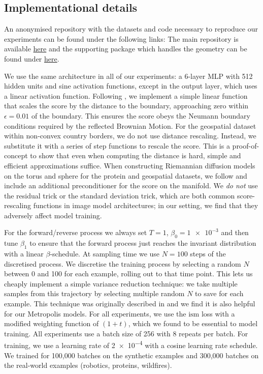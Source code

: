 \subsection{Implementational details}
\label{sec:app_implementational_details}

An anonymised repository with the datasets and code necessary to reproduce our experiments can be found under the following links: The main repository is available \href{https://anonymous.4open.science/r/constrained-diffusion-models/}{here} and the supporting package which handles the geometry can be found under \href{https://anonymous.4open.science/r/geomstats-with-boundary/}{here}.

We use the same architecture in all of our experiments: a 6-layer MLP with 512 hidden units and sine activation functions, except in the output layer, which uses a linear activation function.
Following \cite{fishman2023diffusion}, we implement a simple linear function that scales the score by the distance to the boundary, approaching zero within $\epsilon = 0.01$ of the boundary.
This ensures the score obeys the Neumann boundary conditions required by the reflected Brownian Motion.
For the geospatial dataset within non-convex country borders, we do not use distance rescaling.
Instead, we substitute it with a series of step functions to rescale the score.
This is a proof-of-concept to show that even when computing the distance is hard, simple and efficient approximations suffice.
When constructing Riemannian diffusion models on the torus and sphere for the protein and geospatial datasets, we follow \cite{de2022riemannian} and include an additional preconditioner for the score on the manifold.
We \emph{do not} use the residual trick or the standard deviation trick, which are both common score-rescaling functions in image model architectures; in our setting, we find that they adversely affect model training.

For the forward/reverse process we always set $T=1$, $\beta_0=\num{1e-3}$ and then tune $\beta_1$ to ensure that the forward process just reaches the invariant distribution with a linear $\beta$-schedule.
At sampling time we use $N=100$ steps of the discretised process.
We discretise the training process by selecting a random $N$ between 0 and 100 for each example, rolling out to that time point.
This lets us cheaply implement a simple variance reduction technique: we take multiple samples from this trajectory by selecting multiple random $N$ to save for each example.
This technique was originally described in \cite{fishman2023diffusion} and we find it is also helpful for our Metropolis models.
For all experiments, we use the $\mathrm{ism}$ loss with a modified weighting function of $(1 + t)$, which we found to be essential to model training.
All experiments use a batch size of 256 with 8 repeats per batch.
For training, we use a learning rate of \num{2e-4} with a cosine learning rate schedule.
We trained for 100,000 batches on the synthetic examples and 300,000 batches on the real-world examples (robotics, proteins, wildfires).

